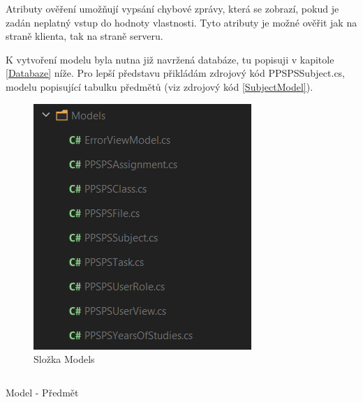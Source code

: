 \documentclass[a4paper, 12pt]{report}
\begin{document}
	Atributy ověření umožňují vypsání chybové zprávy, která se zobrazí, pokud je zadán neplatný vstup do hodnoty vlastnosti. Tyto atributy je možné ověřit jak na straně klienta, tak na straně serveru.\par
	K vytvoření modelu byla nutna již navržená databáze, tu popisuji v kapitole \ref{Databaze} níže. Pro lepší představu přikládám zdrojový kód PPSPSSubject.cs, modelu popisující tabulku předmětů (viz zdrojový kód \ref{SubjectModel}).
	\begin{figure}[H]
		\centering
		\includegraphics[scale=0.6]{Models}
		\caption{Složka Models}
		\label{ModelsFolder}
	\end{figure}
	\begin{listing}[H]
		\inputminted{csharp}{SourceCode/Models/Model.cs}
		\caption{Model - Předmět}
		\label{SubjectModel}
	\end{listing}
\end{document}
